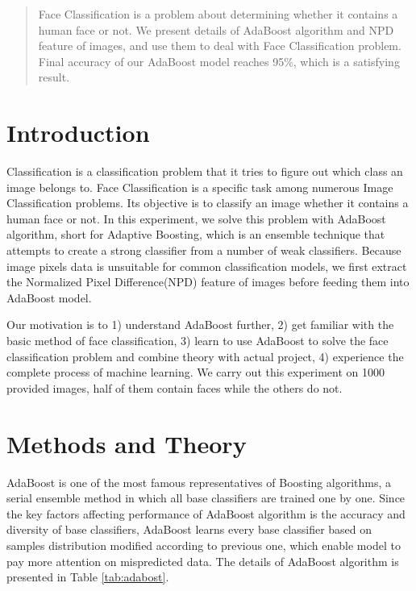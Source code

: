 \documentclass[journal, a4paper]{IEEEtran}
\begin{document}
\begin{abstract}
Face Classification is a problem about determining whether it contains a human face or not.
We present details of AdaBoost algorithm and NPD feature of images, and use them to deal with Face Classification problem.
Final accuracy of our AdaBoost model reaches 95\%, which is a satisfying result.
\end{abstract}

\section{Introduction}
 Classification is a classification problem that it tries to figure out which class an image belongs to.
Face Classification is a specific task among numerous Image Classification problems.
Its objective is to classify an image whether it contains a human face or not.
In this experiment, we solve this problem with AdaBoost algorithm, short for Adaptive Boosting, which is an ensemble technique that attempts to create a strong classifier from a number of weak classifiers.
Because image pixels data is unsuitable for common classification models, we first extract the Normalized Pixel Difference(NPD) feature of images before feeding them into AdaBoost model.

Our motivation is to 1) understand AdaBoost further, 2) get familiar with the basic method of face classification, 3) learn to use AdaBoost to solve the face classification problem and combine theory with actual project, 4) experience the complete process of machine learning.
We carry out this experiment on 1000 provided images, half of them contain faces while the others do not.

\section{Methods and Theory}
AdaBoost is one of the most famous representatives of Boosting algorithms, a serial ensemble method in which all base classifiers are trained one by one.
Since the key factors affecting performance of AdaBoost algorithm is the accuracy and diversity of base classifiers, AdaBoost learns every base classifier based on samples distribution modified according to previous one, which enable model to pay more attention on mispredicted data.
The details of AdaBoost algorithm is presented in Table \ref{tab:adabost}.
\end{document}
